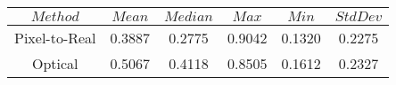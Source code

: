 \begin{table}[h]
\centering
\begin{tabular}{|c|c|c|c|c|c|}
\hline
$Method$ & $Mean$ & $Median$ & $Max$ & $Min$ & $StdDev$ \\
\hline
Pixel-to-Real & 0.3887 & 0.2775 & 0.9042 & 0.1320 & 0.2275 \\
\hline
Optical & 0.5067 & 0.4118 & 0.8505 & 0.1612 & 0.2327 \\
\hline
\end{tabular}
\end{table}
